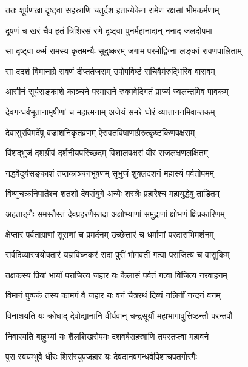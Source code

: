 
\twolineshloka
{ततः शूर्पणखा दृष्ट्वा सहस्राणि चतुर्दश}
{हतान्येकेन रामेण रक्षसां भीमकर्मणाम्} %

\twolineshloka
{दूषणं च खरं चैव हतं त्रिशिरसं रणे}
{दृष्ट्वा पुनर्महानादान् ननाद जलदोपमा} %

\twolineshloka
{सा दृष्ट्वा कर्म रामस्य कृतमन्यैः सुदुष्करम्}
{जगाम परमोद्विग्ना लङ्कां रावणपालिताम्} %

\twolineshloka
{सा ददर्श विमानाग्रे रावणं दीप्ततेजसम्}
{उपोपविष्टं सचिवैर्मरुद्भिरिव वासवम्} %

\twolineshloka
{आसीनं सूर्यसङ्काशे काञ्चने परमासने}
{रुक्मवेदिगतं प्राज्यं ज्वलन्तमिव पावकम्} %

\twolineshloka
{देवगन्धर्वभूतानामृषीणां च महात्मनाम्}
{अजेयं समरे घोरं व्यात्ताननमिवान्तकम्} %

\twolineshloka
{देवासुरविमर्देषु वज्राशनिकृतव्रणम्}
{ऐरावतविषाणाग्रैरुत्कृष्टकिणवक्षसम्} %

\twolineshloka
{विंशद्भुजं दशग्रीवं दर्शनीयपरिच्छदम्}
{विशालवक्षसं वीरं राजलक्षणलक्षितम्} %

\twolineshloka
{नद्धवैदूर्यसङ्काशं तप्तकाञ्चनभूषणम्}
{सुभुजं शुक्लदशनं महास्यं पर्वतोपमम्} %

\twolineshloka
{विष्णुचक्रनिपातैश्च शतशो देवसंयुगे}
{अन्यैः शस्त्रैः प्रहारैश्च महायुद्धेषु ताडितम्} %

\twolineshloka
{अहताङ्गैः समस्तैस्तं देवप्रहरणैस्तदा}
{अक्षोभ्याणां समुद्राणां क्षोभणं क्षिप्रकारिणम्} %

\twolineshloka
{क्षेप्तारं पर्वताग्राणां सुराणां च प्रमर्दनम्}
{उच्छेत्तारं च धर्माणां परदाराभिमर्शनम्} %

\twolineshloka
{सर्वदिव्यास्त्रयोक्तारं यज्ञविघ्नकरं सदा}
{पुरीं भोगवतीं गत्वा पराजित्य च वासुकिम्} %

\twolineshloka
{तक्षकस्य प्रियां भार्यां पराजित्य जहार यः}
{कैलासं पर्वतं गत्वा विजित्य नरवाहनम्} %

\twolineshloka
{विमानं पुष्पकं तस्य कामगं वै जहार यः}
{वनं चैत्ररथं दिव्यं नलिनीं नन्दनं वनम्} %

\twolineshloka
{विनाशयति यः क्रोधाद् देवोद्यानानि वीर्यवान्}
{चन्द्रसूर्यौ महाभागावुत्तिष्ठन्तौ परन्तपौ} %

\twolineshloka
{निवारयति बाहुभ्यां यः शैलशिखरोपमः}
{दशवर्षसहस्राणि तपस्तप्त्वा महावने} %

\twolineshloka
{पुरा स्वयम्भुवे धीरः शिरांस्युपजहार यः}
{देवदानवगन्धर्वपिशाचपतगोरगैः} %

